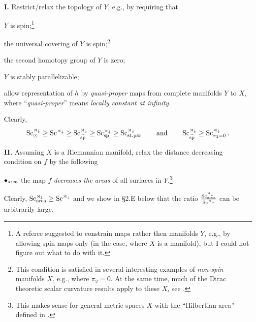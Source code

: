 \documentclass[10pt,a4paper]{amsart}
\numberwithin{equation}{section}
\begin{document}
\textbf{I.} Restrict/relax the topology of $Y$, e.g., by requiring that
\begin{description}\itemsep=0pt\setlength{\leftskip}{0.50cm}
\item[$\bullet_{\rm sp}$] $Y$ is spin;\footnote{A referee suggested to constrain maps
rather then manifolds $Y$, e.g., by allowing spin maps only (in the case, where $X$ is a manifold), but I could not figure out what to do with it.}
\item[$\bullet_{\widetilde{\rm sp}} $] the universal covering of $Y$ is spin;\footnote{This condition is satisfied in several interesting examples of {\it non-spin} manifolds $X$, e.g., where $\pi_2=0 $. At the same time, much of the Dirac theoretic scalar curvature results apply to these $X$, see \cite[Section~$9\frac12$]{Gr1996}.}
\item[$\bullet_{\pi_2=0}$] the second homotopy group of $Y$ is zero;
\item[$\bullet_{\rm st.par}$] $Y$ is stably parallelizable;
\item[$\bullet_{\odot}$] allow representation of $h$
 by {\it quasi-proper} maps from complete manifolds $Y$ to $X$, where ``{\it quasi-proper}'' means {\it locally constant at infinity.}
\end{description}

Clearly,
\begin{gather*}
 \operatorname{Sc}^{\rtimes_\downarrow}_\odot\geq \operatorname{Sc}^{\rtimes_\downarrow}\geq \operatorname{Sc}^{\rtimes_\downarrow} _{\widetilde {\rm sp}} \geq \operatorname{Sc}^{\rtimes_\downarrow} _{\rm sp}\geq
\operatorname{Sc}^{\rtimes_\downarrow} _{\rm st.par} \qquad \text{and}\qquad \operatorname{Sc}^{\rtimes_\downarrow} _{\widetilde{\rm sp}}\geq \operatorname{Sc}^{\rtimes_\downarrow} _{\pi_2=0}.
\end{gather*}

\textbf{II.} Assuming $X$ is a Riemannian manifold, relax the distance decreasing condition on $f$ by the following

$\bullet_{\rm area}$
the map $f$ {\it decreases the areas} of all surfaces in $Y$.\footnote{This makes sense for general metric spaces $X$
with the ``Hilbertian area'' defined in \cite{Gr2018'}.}

Clearly, $\operatorname{Sc}_{\rm area} ^{\rtimes_\downarrow}\geq \operatorname{Sc}^{\rtimes_\downarrow}$ and we show in \S2.E below that the ratio
 $\operatorname{Sc}_{\rm area} ^{\rtimes_\downarrow}\over \operatorname{Sc}^{\rtimes_\downarrow}$ can be arbitrarily large.
\end{document}
